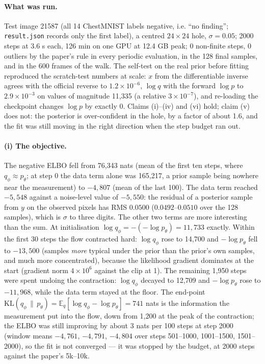 \documentclass[11pt]{article}
\begin{document}
\paragraph{What was run.} Test image 21587 (all 14 ChestMNIST labels
negative, i.e. ``no finding''; \texttt{result.json} records only the first
label), a centred $24 \times 24$ hole, $\sigma = 0.05$; 2000 steps at 3.6 s each,
126 min on one GPU at 12.4 GB peak; 0 non-finite steps, 0 outliers by the
paper's rule in every periodic evaluation, in the 128 final samples, and in
the 600 frames of the walk. The self-test on the real prior before fitting
reproduced the scratch-test numbers at scale: $x$ from the differentiable
inverse agrees with the official reverse to $1.2 \times 10^{-6}$, $\log q$
with the forward $\log p$ to $2.9 \times 10^{-3}$ on values of magnitude
11,335 (a relative $3 \times 10^{-7}$), and re-loading the checkpoint
changes $\log p$ by exactly 0. Claims (i)--(iv) and (vi) hold; claim (v)
does not: the posterior is over-confident in the hole, by a factor of about
1.6, and the fit was still moving in the right direction when the step
budget ran out.

\paragraph{(i) The objective.} The negative ELBO fell from 76,343 nats
(mean of the first ten steps, where $q_\phi \approx p_\theta$; at step 0 the
data term alone was 165,217, a prior sample being nowhere near the
measurement) to $-4{,}807$ (mean of the last 100). The data term reached
$-5{,}548$ against a noise-level value of $-5{,}550$: the residual of a
posterior sample from $y$ on the observed pixels has RMS $0.0500$ ($0.0492$--$0.0510$
over the 128 samples), which is $\sigma$ to three digits. The other two
terms are more interesting than the sum. At initialisation $\log q_\phi =
-(-\log p_\theta) = 11{,}733$ exactly. Within the first 30 steps the flow
contracted hard: $\log q_\phi$ rose to 14,700 and $-\log p_\theta$ fell to
$-13{,}500$ (samples \emph{more} typical under the prior than the prior's own
samples, and much more concentrated), because the likelihood gradient
dominates at the start (gradient norm $4 \times 10^{6}$ against the clip at 1).
The remaining 1,950 steps were spent undoing the contraction: $\log q_\phi$
decayed to 12,709 and $-\log p_\theta$ rose to $-11{,}968$, while the data term
stayed at the floor. The end-point $\mathrm{KL}(q_\phi \,\|\, p_\theta) =
\mathbb{E}_q[\log q_\phi - \log p_\theta] = 741$ nats is the information the
measurement put into the flow, down from 1,200 at the peak of the
contraction; the ELBO was still improving by about 3 nats per 100 steps at
step 2000 (window means $-4{,}761$, $-4{,}791$, $-4{,}804$ over steps
501--1000, 1001--1500, 1501--2000), so the fit is not converged --- it was
stopped by the budget, at 2000 steps against the paper's 5k--10k.
\end{document}
